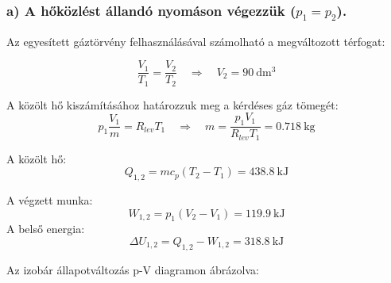 \noindent\hrulefill

\subsubsection{a) A hőközlést állandó nyomáson végezzük ($ p_1=p_2 $).}
\vspace{2mm}
\noindent Az egyesített gáztörvény felhasználásával számolható a megváltozott térfogat:

\begin{equation}
\dfrac{V_1}{T_1}=\dfrac{V_2}{T_2}
\quad 
\Rightarrow
\quad
V_2=\SI{90}{\deci\meter\cubed}
\end{equation}

\noindent A közölt hő kiszámításához határozzuk meg a kérdéses gáz tömegét:
\begin{equation}
p_1\dfrac{V_1}{m}=R_{lev}T_1
\quad
\Rightarrow
\quad
m=\dfrac{p_1 V_1}{R_{lev}T_1}=\SI{0,718}{\kilogram}
\end{equation}

\noindent A közölt hő:
\begin{equation}
Q_{1,2}=m c_p\left(T_2-T_1\right)=\SI{438,8}{\kilo\joule}
\end{equation}

\noindent A végzett munka:
\begin{equation}
W_{1,2}=p_1\left(V_2-V_1\right)=\SI{119,9}{\kilo\joule}
\end{equation}
\noindent A belső energia:
\begin{equation}
\Delta U_{1,2}= Q_{1,2}-W_{1,2}=\SI{318,8}{\kilo\joule}
\end{equation}

\noindent Az izobár állapotváltozás p-V diagramon ábrázolva:

